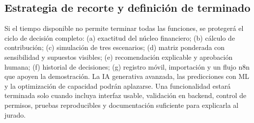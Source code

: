 \subsection{Estrategia de recorte y definición de terminado}

Si el tiempo disponible no permite terminar todas las funciones, se protegerá el ciclo de decisión completo: (a) exactitud del núcleo financiero; (b) cálculo de contribución; (c) simulación de tres escenarios; (d) matriz ponderada con sensibilidad y supuestos visibles; (e) recomendación explicable y aprobación humana; (f) historial de decisiones; (g) registro móvil, importación y un flujo n8n que apoyen la demostración. La IA generativa avanzada, las predicciones con ML y la optimización de capacidad podrán aplazarse. Una funcionalidad estará terminada solo cuando incluya interfaz usable, validación en backend, control de permisos, pruebas reproducibles y documentación suficiente para explicarla al jurado.

